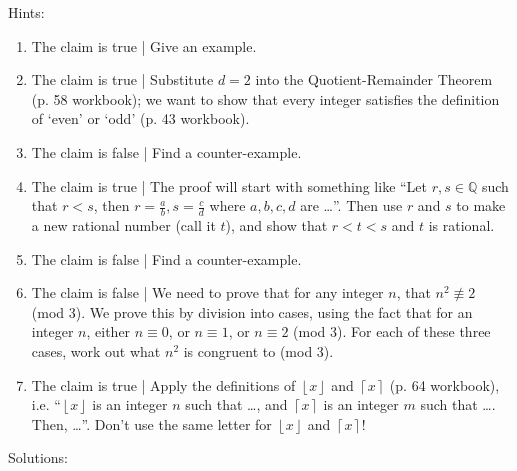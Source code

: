 \documentclass[a4paper,12pt]{article}
\newcommand{\floor}[1]{\left\lfloor #1 \right\rfloor}
\newcommand{\ceil}[1]{\left\lceil #1 \right\rceil}
\begin{document}
\newpage

Hints:

\begin{enumerate}
\item The claim is true | Give an example.
\\
\item The claim is true | Substitute $d = 2$ into the Quotient-Remainder
Theorem (p. 58 workbook); we want to show that every integer satisfies the definition of
`even' or `odd' (p. 43 workbook).
\\
\item The claim is false | Find a counter-example.
\\
\item The claim is true | The proof will start with something like
``Let $r, s \in \mathbb{Q}$ such that $r < s$, then $r = \frac{a}{b},
s = \frac{c}{d}$ where $a, b, c, d$ are \dots''.
Then use $r$ and $s$ to make a new rational number (call it $t$), and show that
$r < t < s$ and $t$ is rational.
\\
\item The claim is false | Find a counter-example.
\\
\item The claim is false | We need to prove that for any integer $n$, that
$n^2 \not\equiv 2$ (mod 3). We prove this by division into cases, using the
fact that for an integer $n$, either $n \equiv 0$,
or $n \equiv 1$, or $n \equiv 2$ (mod 3). For each of these three cases,
work out what $n^2$ is congruent to (mod 3).
\\
\item The claim is true | Apply the definitions of $\floor{x}$ and $\ceil{x}$
(p. 64 workbook), i.e. ``$\floor{x}$ is an integer $n$ such that
\dots, and $\ceil{x}$ is an integer $m$ such that \dots. Then, \dots''.
Don't use the same letter for $\floor{x}$ and $\ceil{x}$!
\end{enumerate}

\newpage

Solutions:
\end{document}
